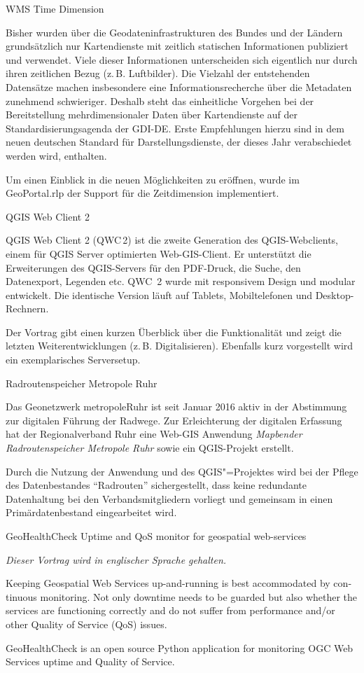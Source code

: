 %
{WMS Time Dimension}%
{}%
{
Bisher wurden über die Geodateninfrastrukturen des Bundes und der Ländern
grundsätzlich nur Kartendienste mit zeitlich statischen Informationen
publiziert und verwendet. Viele dieser Informationen
unterscheiden sich eigentlich nur durch ihren zeitlichen Bezug (z.\,B. Luftbilder). Die Vielzahl
der entstehenden Datensätze machen insbesondere eine Informationsrecherche über
die Metadaten zunehmend schwieriger. Deshalb steht das
einheitliche Vorgehen bei der Bereitstellung mehrdimensionaler Daten über
Kartendienste auf der Standardisierungsagenda der GDI-DE. Erste Empfehlungen
hierzu sind in dem neuen deutschen Standard für Darstellungsdienste, der dieses Jahr
verabschiedet werden wird, enthalten.

Um einen Einblick in die neuen Möglichkeiten zu eröffnen, wurde im
GeoPortal.rlp der Support für die Zeitdimension implementiert.%
}

%
{QGIS Web Client 2}%
{}%
{
QGIS Web Client 2 (QWC\,2) ist die zweite Generation des QGIS-Webclients, einem für QGIS Server
optimierten Web-GIS-Client. Er unterstützt die Erweiterungen des QGIS-Servers für den PDF-Druck, die Suche,
den Datenexport, Legenden etc. QWC~2 wurde mit responsivem Design und modular entwickelt. Die identische
Version läuft auf Tablets, Mobiltelefonen und Desktop-Rechnern.

Der Vortrag gibt einen kurzen Überblick über die Funktionalität und zeigt die letzten
Weiterentwicklungen (z.\,B. Digitalisieren). Ebenfalls kurz vorgestellt wird ein exemplarisches
Serversetup.%
}


%
{Radroutenspeicher Metropole Ruhr}%
{}%
{
Das Geonetzwerk metropoleRuhr ist seit Januar 2016 aktiv in der Abstimmung zur digitalen
Führung der Radwege. Zur Erleichterung der digitalen Erfassung hat der Regionalverband
Ruhr eine Web-GIS Anwendung \emph{Mapbender Radroutenspeicher Metropole Ruhr} sowie ein
QGIS-Projekt erstellt.

Durch die Nutzung der Anwendung und des QGIS"=Projektes wird bei der Pflege
des Datenbestandes "`Radrouten"' sichergestellt, dass keine redundante Datenhaltung bei den
Verbandsmitgliedern vorliegt und gemeinsam in einen Primärdatenbestand eingearbeitet wird.%
}

%
{GeoHealthCheck}%
{Uptime and QoS monitor for geospatial web-services}%
{
  \emph{Dieser Vortrag wird in englischer Sprache gehalten.}

  \begin{otherlanguage}{english}
    Keeping Geospatial Web Services up-and-running is best accommodated by continuous monitoring.  Not
    only downtime needs to be guarded but also whether the services are functioning correctly and do not
    suffer from performance and/or other Quality of Service (QoS) issues.

    GeoHealthCheck is an open source Python application for monitoring OGC Web Services
    uptime and Quality of Service.
  \end{otherlanguage}%
}

